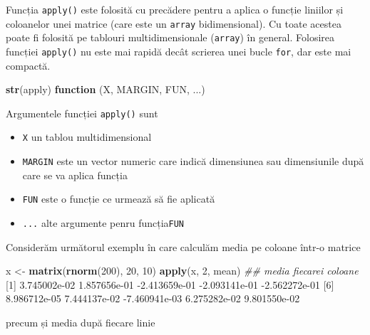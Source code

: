 \documentclass[]{article}
\newenvironment{Shaded}{\begin{snugshade}}{\end{snugshade}}
\newcommand{\CommentTok}[1]{\textcolor[rgb]{0.56,0.35,0.01}{\textit{#1}}}
\newcommand{\ControlFlowTok}[1]{\textcolor[rgb]{0.13,0.29,0.53}{\textbf{#1}}}
\newcommand{\DecValTok}[1]{\textcolor[rgb]{0.00,0.00,0.81}{#1}}
\newcommand{\FloatTok}[1]{\textcolor[rgb]{0.00,0.00,0.81}{#1}}
\newcommand{\KeywordTok}[1]{\textcolor[rgb]{0.13,0.29,0.53}{\textbf{#1}}}
\newcommand{\NormalTok}[1]{#1}
\newcommand{\StringTok}[1]{\textcolor[rgb]{0.31,0.60,0.02}{#1}}
\providecommand{\tightlist}{%
  \setlength{\itemsep}{0pt}\setlength{\parskip}{0pt}}
\begin{document}
Funcția \texttt{apply()} este folosită cu precădere pentru a aplica o
funcție liniilor și coloanelor unei matrice (care este un \texttt{array}
bidimensional). Cu toate acestea poate fi folosită pe tablouri
multidimensionale (\texttt{array}) în general. Folosirea funcției
\texttt{apply()} nu este mai rapidă decât scrierea unei bucle
\texttt{for}, dar este mai compactă.

\begin{Shaded}
\begin{Highlighting}[]
\KeywordTok{str}\NormalTok{(apply)}
\ControlFlowTok{function}\NormalTok{ (X, MARGIN, FUN, ...)  }
\end{Highlighting}
\end{Shaded}

Argumentele funcției \texttt{apply()} sunt

\begin{itemize}
\tightlist
\item
  \texttt{X} un tablou multidimensional
\item
  \texttt{MARGIN} este un vector numeric care indică dimensiunea sau
  dimensiunile după care se va aplica funcția
\item
  \texttt{FUN} este o funcție ce urmează să fie aplicată
\item
  \texttt{...} alte argumente penru funcția\texttt{FUN}
\end{itemize}

Considerăm următorul exemplu în care calculăm media pe coloane într-o
matrice

\begin{Shaded}
\begin{Highlighting}[]
\NormalTok{x <-}\StringTok{ }\KeywordTok{matrix}\NormalTok{(}\KeywordTok{rnorm}\NormalTok{(}\DecValTok{200}\NormalTok{), }\DecValTok{20}\NormalTok{, }\DecValTok{10}\NormalTok{)}
\KeywordTok{apply}\NormalTok{(x, }\DecValTok{2}\NormalTok{, mean)  }\CommentTok{## media fiecarei coloane}
\NormalTok{ [}\DecValTok{1}\NormalTok{]  }\FloatTok{3.745002e-02}  \FloatTok{1.857656e-01} \FloatTok{-2.413659e-01} \FloatTok{-2.093141e-01} \FloatTok{-2.562272e-01}
\NormalTok{ [}\DecValTok{6}\NormalTok{]  }\FloatTok{8.986712e-05}  \FloatTok{7.444137e-02} \FloatTok{-7.460941e-03}  \FloatTok{6.275282e-02}  \FloatTok{9.801550e-02}
\end{Highlighting}
\end{Shaded}

precum și media după fiecare linie
\end{document}
